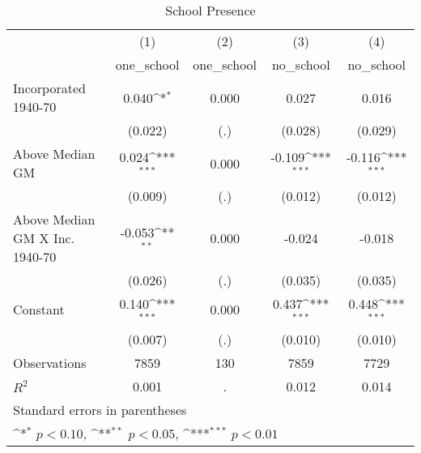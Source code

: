 \begin{table}[htbp]\centering
\def\sym#1{\ifmmode^{#1}\else\(^{#1}\)\fi}
\caption{School Presence}
\begin{tabular}{l*{4}{c}}
\hline\hline
                    &\multicolumn{1}{c}{(1)}&\multicolumn{1}{c}{(2)}&\multicolumn{1}{c}{(3)}&\multicolumn{1}{c}{(4)}\\
                    &\multicolumn{1}{c}{one\_school}&\multicolumn{1}{c}{one\_school}&\multicolumn{1}{c}{no\_school}&\multicolumn{1}{c}{no\_school}\\
\hline
Incorporated 1940-70&       0.040\sym{*}  &       0.000         &       0.027         &       0.016         \\
                    &     (0.022)         &         (.)         &     (0.028)         &     (0.029)         \\
[1em]
Above Median GM     &       0.024\sym{***}&       0.000         &      -0.109\sym{***}&      -0.116\sym{***}\\
                    &     (0.009)         &         (.)         &     (0.012)         &     (0.012)         \\
[1em]
Above Median GM X Inc. 1940-70&      -0.053\sym{**} &       0.000         &      -0.024         &      -0.018         \\
                    &     (0.026)         &         (.)         &     (0.035)         &     (0.035)         \\
[1em]
Constant            &       0.140\sym{***}&       0.000         &       0.437\sym{***}&       0.448\sym{***}\\
                    &     (0.007)         &         (.)         &     (0.010)         &     (0.010)         \\
\hline
Observations        &        7859         &         130         &        7859         &        7729         \\
\(R^{2}\)           &       0.001         &           .         &       0.012         &       0.014         \\
\hline\hline
\multicolumn{5}{l}{\footnotesize Standard errors in parentheses}\\
\multicolumn{5}{l}{\footnotesize \sym{*} \(p<0.10\), \sym{**} \(p<0.05\), \sym{***} \(p<0.01\)}\\
\end{tabular}
\end{table}
